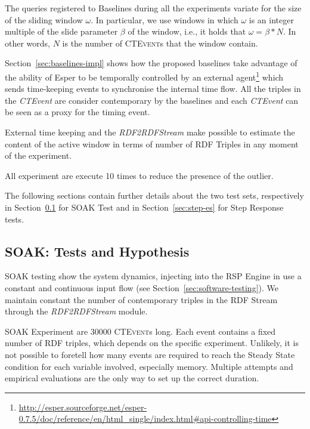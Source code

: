The queries registered to \name Baselines during all the experiments variate for the size of the sliding window $\omega$. In particular, we use windows in which $\omega$ is an integer multiple of the slide parameter $\beta$ of the window, i.e., it holds that $\omega = \beta * N$. In other words, $N$ is the number of \textsc{CTEvent}s that the window contain. 

Section~\ref{sec:baselines-impl} shows how the proposed baselines take advantage of the ability of Esper to be temporally controlled by an external agent\footnote{\url{http://esper.sourceforge.net/esper-0.7.5/doc/reference/en/html_single/index.html#api-controlling-time}} which sends time-keeping events to synchronise the internal time flow. All the triples in the \textit{CTEvent} are consider contemporary by the baselines and each \textit{CTEvent} can be seen as a proxy for the timing event. 

External time keeping and the \textit{RDF2RDFStream} make possible to estimate the content of the active window in terms of number of RDF Triples in any moment of the experiment.

All experiment are execute 10 times to reduce the presence of the outlier.

The following sections contain further details about the two test sets, respectively in Section~\ref{sec:soak-es} for SOAK Test and in Section~\ref{sec:step-es} for Step Response tests.

\subsection{SOAK: Tests and Hypothesis}\label{sec:soak-es}

SOAK testing show the system dynamics, injecting into the RSP Engine in use a constant and continuous input flow (see Section~\ref{sec:software-testing}). We maintain constant the number of contemporary triples in the RDF Stream through the \textit{RDF2RDFStream} module. %

SOAK Experiment are 30000 \textsc{CTEvent}s long. Each event contains a fixed number of RDF triples, which depends on the specific experiment. Unlikely, it is not possible to foretell how many events are required to reach the Steady State condition for each variable involved, especially memory. Multiple attempts and empirical evaluations are the only way to set up the correct duration.

